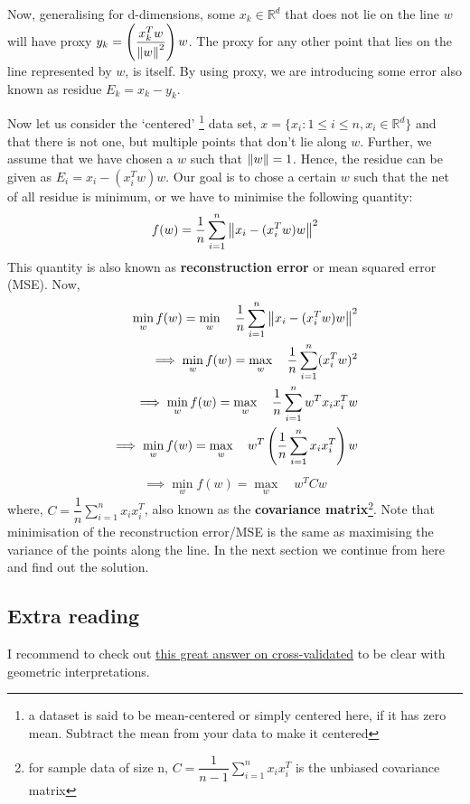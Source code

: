 \documentclass[12pt,a4paper]{article}
\begin{document}
Now, generalising for d-dimensions, some $x_k \in \mathbb{R}^d$ that does not lie on the line $w$ will have proxy  $y_k= \left(\dfrac{x_k^Tw}{\norm{w}^2} \right) w$. The proxy for any other point that lies on the line represented by $w$, is itself. By using proxy, we are introducing some error also known as residue $E_k = x_k-y_k$.

Now let us consider the `centered' \footnote{a dataset is said to be mean-centered or simply centered here, if it has zero mean. Subtract the mean from your data to make it centered} data set, $x=\{x_i: 1 \leq i \leq n, x_i \in \mathbb{R}^d \}$ and that there is not one, but multiple points that don't lie along $w$. Further, we assume that we have chosen a $w$ such that $\norm{w}=1$. Hence, the residue can be given as $E_i = x_i - (x_i^Tw)w$. Our goal is to chose a certain $w$ such that the net of all residue is minimum, or we have to minimise the following quantity: 
\begin{align}
    f(w)= \dfrac{1}{n} \sum_{i=1}^{n} \norm{x_i - (x_i^Tw)w}^2
\end{align}
This quantity is also known as \textbf{reconstruction error} or mean squared error (MSE). Now,
\begin{align*}
    \min_w f(w) = \min_w \quad \dfrac{1}{n} \sum_{i=1}^{n} \norm{x_i - (x_i^Tw)w}^2\\
    \implies \min_w f(w)= \max_w \quad \dfrac{1}{n} \sum_{i=1}^{n} (x_i^Tw)^2\\
    \implies \min_w f(w)= \max_w \quad \dfrac{1}{n} \sum_{i=1}^{n} w^T x_i x_i^T w\\
    \implies \min_w f(w)= \max_w \quad w^T \left(\dfrac{1}{n} \sum_{i=1}^{n} x_i x_i^T \right) w
\end{align*}
\begin{align}
    \implies \boxed{\min_w f(w) = \max_w \quad w^T C w}
\end{align}
where, $C= \dfrac{1}{n} \sum_{i=1}^{n} x_i x_i^T$, also known as the \textbf{covariance matrix}\footnote{for sample data of size n, $C= \dfrac{1}{n-1} \sum_{i=1}^{n} x_i x_i^T$ is the unbiased covariance matrix}. Note that minimisation of the reconstruction error/MSE is the same as maximising the variance of the points along the line. In the next section we continue from here and find out the solution. 
\subsection{Extra reading}
I recommend to check out \href{https://stats.stackexchange.com/a/140579}{this great answer on cross-validated} to be clear with geometric interpretations.
\end{document}
